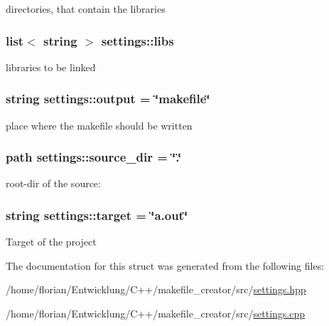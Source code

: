 directories, that contain the libraries \hypertarget{structsettings_a7c19b7fd03fe16661f946dbfc1417cb4}{
\subsubsection[{libs}]{\setlength{\rightskip}{0pt plus 5cm}list$<$ string $>$ settings\-::libs\hspace{0.3cm}{\ttfamily [static]}}}\label{structsettings_a7c19b7fd03fe16661f946dbfc1417cb4}
libraries to be linked \hypertarget{structsettings_a0ee03de4526f2243b1a8fccfe99021fc}{
\subsubsection[{output}]{\setlength{\rightskip}{0pt plus 5cm}string settings\-::output = \char`\"{}makefile\char`\"{}\hspace{0.3cm}{\ttfamily [static]}}}\label{structsettings_a0ee03de4526f2243b1a8fccfe99021fc}
place where the makefile should be written \hypertarget{structsettings_a60c9f664edda432102c9975131edfa1e}{
\subsubsection[{source\-\_\-dir}]{\setlength{\rightskip}{0pt plus 5cm}path settings\-::source\-\_\-dir = \char`\"{}.\char`\"{}\hspace{0.3cm}{\ttfamily [static]}}}\label{structsettings_a60c9f664edda432102c9975131edfa1e}
root-\/dir of the source\-: \hypertarget{structsettings_a9f3ce046370466aa963ce6096b6fcacd}{
\subsubsection[{target}]{\setlength{\rightskip}{0pt plus 5cm}string settings\-::target = \char`\"{}a.\-out\char`\"{}\hspace{0.3cm}{\ttfamily [static]}}}\label{structsettings_a9f3ce046370466aa963ce6096b6fcacd}
Target of the project 

The documentation for this struct was generated from the following files\-:\begin{DoxyCompactItemize}
\item 
/home/florian/\-Entwicklung/\-C++/makefile\-\_\-creator/src/\hyperlink{settings_8hpp}{settings.\-hpp}\item 
/home/florian/\-Entwicklung/\-C++/makefile\-\_\-creator/src/\hyperlink{settings_8cpp}{settings.\-cpp}\end{DoxyCompactItemize}
